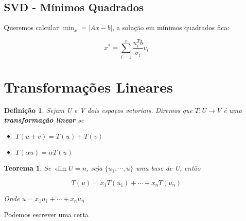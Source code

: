 \documentclass[12pt]{article}
\newtheorem{theorem}{Teorema}
\newtheorem{definition}{Definição}
\begin{document}
\subsection*{SVD - Mínimos Quadrados}
Queremos calcular $\min_x = |A x - b|$, a solução em mínimos quadrados fica:

$$x^* = \sum_{i = 1}^r \dfrac{u_i^T b}{\sigma_i} v_i$$

\section*{Transformações Lineares}
\begin{definition}
    Sejam U e V dois espaços vetoriais. Diremos que $T: U \rightarrow V$ é uma \textbf{transformação linear} se
    
    \begin{itemize}
        \item $T(u + v) = T(u) + T(v)$
        
        \item $T(\alpha u) = \alpha T(u)$
    \end{itemize}
\end{definition}

\begin{theorem}
    Se $\dim U = n$, seja $\{u_1, \cdots, u \}$ uma base de U, então
    
    $$T(u) = x_1 T(u_1) + \cdots + x_n T(u_n)$$
    
    Onde $u = x_1 u_1 + \cdots + x_n u_n$
\end{theorem}

Podemos escrever uma certa 

\end{document}
